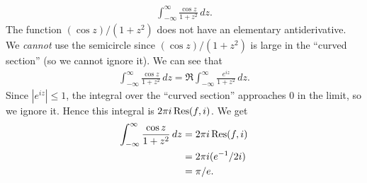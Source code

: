\documentclass[11pt, oneside,margin=1in]{article}
\begin{document}
\begin{example}[ ]\label{}\text{}
\begin{align*}
	\int_{-\infty}^{\infty} \frac{\cos z}{1+z^2}  \, dz.
\end{align*}
The function $(\cos z)/ (1+z^2)$ does not have an elementary antiderivative. We \emph{cannot} use the semicircle since $(\cos z)/ (1+z^2)$ is large in the ``curved section'' (so we cannot ignore it). We can see that 
 \begin{align*}
	\int_{-\infty}^{\infty} \frac{\cos z}{1+z^2}  \, dz = \Re \int_{-\infty}^{\infty} \frac{e^{iz}}{1+z^2}  \, dz. 
\end{align*}
Since $\left\lvert e^{iz} \right\rvert \le 1$, the integral over the ``curved section'' approaches $0$ in the limit, so we ignore it. Hence this integral is $2\pi i\operatorname{Res}(f, i)$. We get
\begin{align*}
	\int_{-\infty}^{\infty} \frac{\cos z}{1+z^2}  \, dz &= 2\pi i \operatorname{Res}(f,i)\\
							    &= 2\pi i  (e^{-1}/2i)\\
							    &=\pi/e.
\end{align*}
\end{example}
\end{document}
